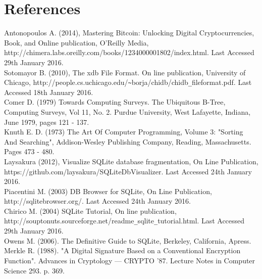 \section*{References}
\label{sec:references}

	

\begin{thebibliography}{0}

Antonopoulos A. (2014), Mastering Bitcoin: Unlocking Digital Cryptocurrencies, Book, and Online publication, O'Reilly Media, http://chimera.labs.oreilly.com/books/1234000001802/index.html. Last Accessed 29th January 2016.
\\
Sotomayor B. (2010), The xdb File Format. On line publication, University of Chicago, http://people.cs.uchicago.edu/\verb|~|borja/chidb/chidb\verb|_|fileformat.pdf. Last Accessed 18th January 2016.
\\
Comer D. (1979) Towards Computing Surveys. The Ubiquitous B-Tree, Computing Surveys, Vol 11, No. 2. Purdue University, West Lafayette, Indiana, June 1979, pages 121 - 137.
\\
Knuth E. D. (1973) The Art Of Computer Programming, Volume 3: "Sorting And Searching", Addison-Wesley Publishing Company, Reading, Massachusetts. Pages 473 - 480.
\\
Laysakura (2012), Visualize SQLite database fragmentation, On Line Publication, https://github.com/laysakura/SQLiteDbVisualizer. Last Accessed 24th January 2016.
\\
Piacentini M. (2003) DB Browser for SQLite, On Line Publication, http://sqlitebrowser.org/. Last Accessed 24th January 2016.
\\
Chirico M. (2004) SQLite Tutorial, On line publication, http://souptonuts.sourceforge.net/readme\verb|_|sqlite\verb|_|tutorial.html. Last Accessed 29th January 2016.
\\
Owens M. (2006). The Definitive Guide to SQLite, Berkeley, California, Apress. 
\\
Merkle R. (1988). "A Digital Signature Based on a Conventional Encryption Function". Advances in Cryptology — CRYPTO '87. Lecture Notes in Computer Science 293. p. 369.

\end{thebibliography}
